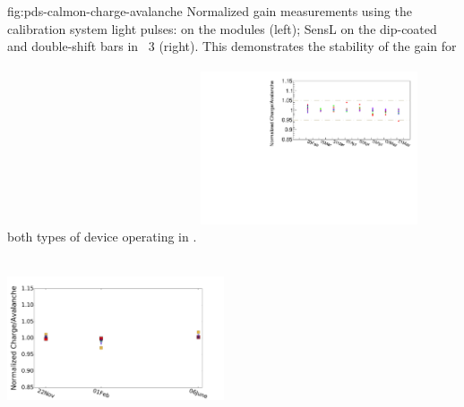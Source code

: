 \begin{dunefigure}
 {fig:pds-calmon-charge-avalanche}
 {Normalized gain measurements using the calibration system light pulses:   on the  modules (left); SensL  on the dip-coated and double-shift bars in ~3 (right). This demonstrates the stability of the gain for both types of device operating in .}
  \includegraphics[height=5.5cm,width=0.48\textwidth]{graphics/pds-arapuca-calibration-stability.pdf}
  \includegraphics[height=5.5cm,width=0.48\textwidth]{graphics/pds-avg-mean-adc-led-apa3-sensl.pdf}
\end{dunefigure}

